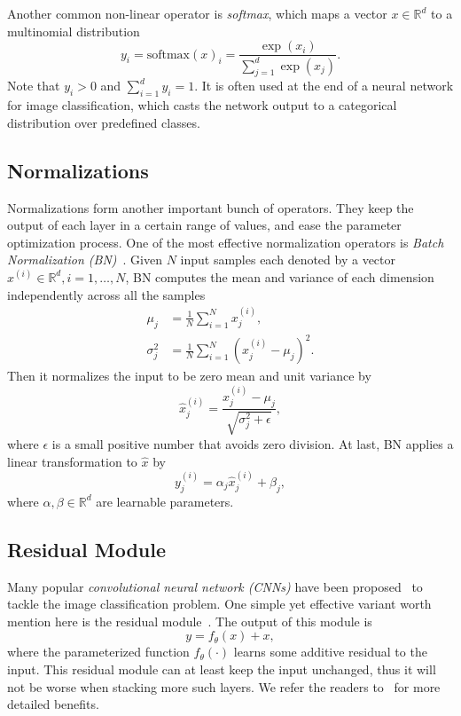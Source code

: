 Another common non-linear operator is \emph{softmax}, which maps a vector $x\in\mathbb{R}^d$ to a multinomial distribution
\begin{equation} \label{eq:softmax}
  y_i=\mathrm{softmax}(x)_i=\frac{\exp(x_i)}{\sum_{j=1}^d \exp(x_j)}.
\end{equation}
Note that $y_i > 0$ and $\sum_{i=1}^d y_i = 1$. It is often used at the end of a neural network for image classification, which casts the network output to a categorical distribution over predefined classes.

\subsection{Normalizations} %
\label{sub:dl-normalizations}
Normalizations form another important bunch of operators. They keep the output of each layer in a certain range of values, and ease the parameter optimization process. One of the most effective normalization operators is \emph{Batch Normalization (BN)}~\cite{ioffe2015batch}. Given $N$ input samples each denoted by a vector $x^{(i)}\in\mathbb{R}^d, i=1,\dots,N$, BN computes the mean and variance of each dimension independently across all the samples
\begin{align}
  \mu_j &= \frac{1}{N} \sum_{i=1}^N x_j^{(i)},\\
  \sigma_j^2 &= \frac{1}{N} \sum_{i=1}^N (x_j^{(i)} - \mu_j)^2.
\end{align}
Then it normalizes the input to be zero mean and unit variance by
\begin{equation}
  \hat{x}_j^{(i)} = \frac{x_j^{(i)} - \mu_j}{\sqrt{\sigma_j^2 + \epsilon}},
\end{equation}
where $\epsilon$ is a small positive number that avoids zero division. At last, BN applies a linear transformation to $\hat{x}$ by
\begin{equation}
  y_j^{(i)} = \alpha_j \hat{x}_j^{(i)} + \beta_j,
\end{equation}
where $\alpha,\beta\in\mathbb{R}^d$ are learnable parameters.

\subsection{Residual Module} %
\label{sub:dl-residual}
Many popular \emph{convolutional neural network (CNNs)} have been proposed~\cite{krizhevsky2012imagenet,simonyan2014very,szegedy2014going} to tackle the image classification problem. One simple yet effective variant worth mention here is the residual module~\cite{he2015deep}. The output of this module is
\begin{equation}
  y = f_\theta(x) + x,
\end{equation}
where the parameterized function $f_\theta(\cdot)$ learns some additive residual to the input. This residual module can at least keep the input unchanged, thus it will not be worse when stacking more such layers. We refer the readers to~\cite{he2015deep,he2016identity} for more detailed benefits.

